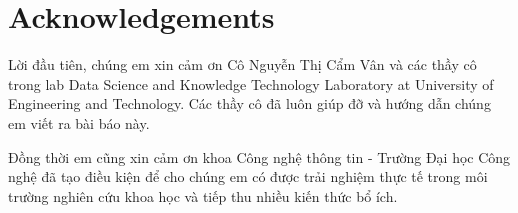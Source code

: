 \chapter*{Acknowledgements}

Lời đầu tiên, chúng em xin cảm ơn Cô Nguyễn Thị Cẩm Vân và các thầy cô trong lab  Data Science and Knowledge Technology Laboratory at University of Engineering and Technology. Các thầy cô đã luôn giúp đỡ và hướng dẫn chúng em viết ra bài báo này.




Đồng thời em cũng xin cảm ơn khoa Công nghệ thông tin - Trường Đại học Công nghệ đã tạo điều kiện để cho chúng em có được trải nghiệm thực tế trong môi trường nghiên cứu khoa học và tiếp thu nhiều kiến thức bổ ích.